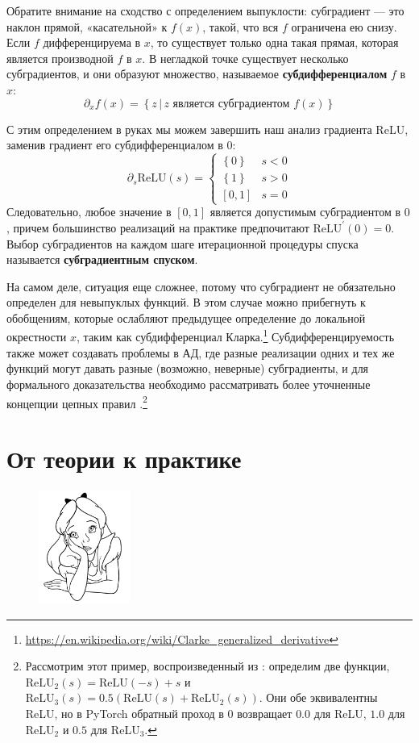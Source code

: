 Обратите внимание на сходство с определением выпуклости: субградиент — это наклон прямой, «касательной» к $f(x)$, такой, что вся $f$ ограничена ею снизу. Если $f$ дифференцируема в $x$, то существует только одна такая прямая, которая является производной $f$ в $x$. В негладкой точке существует несколько субградиентов, и они образуют множество, называемое \textbf{субдифференциалом} $f$ в $x$:
%
$$\partial_x f(x)=\left\{z \,\vert\, z \text{ является субградиентом } f(x)\right\}$$

С этим определением в руках мы можем завершить наш анализ градиента ReLU, заменив градиент его субдифференциалом в $0$:
%
$$\partial_s \text{ReLU}(s)=\begin{cases} \left\{0\right\} & s < 0 \\ \left\{1\right\} & s >0 \\ \left[0,1\right] & s=0 \end{cases}$$
%
Следовательно, любое значение в $[0,1]$ является допустимым субградиентом в $0$, причем большинство реализаций на практике предпочитают $\text{ReLU}^\prime(0)=0$. Выбор субградиентов на каждом шаге итерационной процедуры спуска называется \textbf{субградиентным спуском}. 

На самом деле, ситуация еще сложнее, потому что субградиент не обязательно определен для невыпуклых функций. В этом случае можно прибегнуть к обобщениям, которые ослабляют предыдущее определение до локальной окрестности $x$, таким как субдифференциал Кларка.\footnote{\url{https://en.wikipedia.org/wiki/Clarke_generalized_derivative}} Субдифференцируемость также может создавать проблемы в АД, где разные реализации одних и тех же функций могут давать разные (возможно, неверные) субградиенты, и для формального доказательства необходимо рассматривать более уточненные концепции цепных правил \cite{kakade2018provably,bolte2020mathematical}.\footnote{Рассмотрим этот пример, воспроизведенный из \cite{bolte2020mathematical}: определим две функции, $\text{ReLU}_2(s) = \text{ReLU}(-s)+s$ и $\text{ReLU}_3(s) = 0.5(\text{ReLU}(s)+\text{ReLU}_2(s))$. Они обе эквивалентны ReLU, но в PyTorch обратный проход в $0$ возвращает $0.0$ для ReLU, $1.0$ для ReLU$_2$ и $0.5$ для ReLU$_3$.}

\section*{От теории к практике}

\begin{figure}
\vspace{-3em}\includegraphics[width=3.0cm]{images/shutterstock_2075221579.jpg}
\vspace{-3em}
\end{figure}


